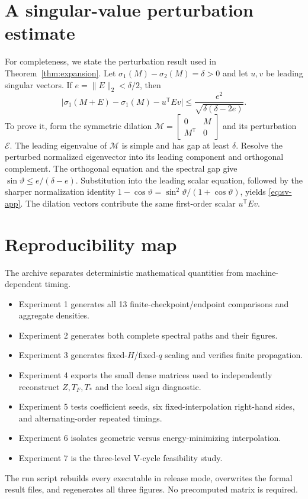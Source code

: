 \documentclass[smallextended]{svjour3}
\newcommand{\T}{\mathsf{T}}
\newcommand{\norm}[1]{\lVert#1\rVert}
\newcommand{\abs}[1]{\lvert#1\rvert}
\begin{document}
\appendix
\section{A singular-value perturbation estimate}\label{app:sv}
For completeness, we state the perturbation result used in Theorem~\ref{thm:expansion}. Let $\sigma_1(M)-\sigma_2(M)=\delta>0$ and let $u,v$ be leading singular vectors. If $e=\norm E_2<\delta/2$, then
\begin{equation}\label{eq:sv-app}
 \abs{\sigma_1(M+E)-\sigma_1(M)-u^{\T}Ev}
 \le\frac{e^2}{\sqrt{\delta(\delta-2e)}}.
\end{equation}
To prove it, form the symmetric dilation
$\mathcal M=\left[\begin{smallmatrix}0&M\\M^\T&0\end{smallmatrix}\right]$ and its perturbation $\mathcal E$. The leading eigenvalue of $\mathcal M$ is simple and has gap at least $\delta$. Resolve the perturbed normalized eigenvector into its leading component and orthogonal complement. The orthogonal equation and the spectral gap give
$\sin\vartheta\le e/(\delta-e)$. Substitution into the leading scalar equation, followed by the sharper normalization identity
$1-\cos\vartheta=\sin^2\vartheta/(1+\cos\vartheta)$, yields \eqref{eq:sv-app}. The dilation vectors contribute the same first-order scalar $u^{\T}Ev$.

\section{Reproducibility map}\label{app:repro}
The archive separates deterministic mathematical quantities from machine-dependent timing.
\begin{itemize}
\item Experiment 1 generates all 13 finite-checkpoint/endpoint comparisons and aggregate densities.
\item Experiment 2 generates both complete spectral paths and their figures.
\item Experiment 3 generates fixed-$H$/fixed-$q$ scaling and verifies finite propagation.
\item Experiment 4 exports the small dense matrices used to independently reconstruct $Z,T_F,T_*$ and the local sign diagnostic.
\item Experiment 5 tests coefficient seeds, six fixed-interpolation right-hand sides, and alternating-order repeated timings.
\item Experiment 6 isolates geometric versus energy-minimizing interpolation.
\item Experiment 7 is the three-level V-cycle feasibility study.
\end{itemize}
The run script rebuilds every executable in release mode, overwrites the formal result files, and regenerates all three figures. No precomputed matrix is required.



\end{document}
